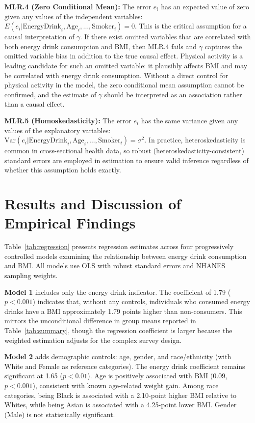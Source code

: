 \documentclass[12pt]{article}
\begin{document}
\textbf{MLR.4 (Zero Conditional Mean):} The error $e_i$ has an expected value of zero given any values of the independent variables: $E(e_i | \text{EnergyDrink}_i, \text{Age}_i, \ldots, \text{Smoker}_i) = 0$. This is the critical assumption for a causal interpretation of $\gamma$. If there exist omitted variables that are correlated with both energy drink consumption and BMI, then MLR.4 fails and $\gamma$ captures the omitted variable bias in addition to the true causal effect. Physical activity is a leading candidate for such an omitted variable: it plausibly affects BMI and may be correlated with energy drink consumption. Without a direct control for physical activity in the model, the zero conditional mean assumption cannot be confirmed, and the estimate of $\gamma$ should be interpreted as an association rather than a causal effect.

\textbf{MLR.5 (Homoskedasticity):} The error $e_i$ has the same variance given any values of the explanatory variables: $\text{Var}(e_i | \text{EnergyDrink}_i, \text{Age}_i, \ldots, \text{Smoker}_i) = \sigma^2$. In practice, heteroskedasticity is common in cross-sectional health data, so robust (heteroskedasticity-consistent) standard errors are employed in estimation to ensure valid inference regardless of whether this assumption holds exactly.

\section{Results and Discussion of Empirical Findings}



Table~\ref{tab:regression} presents regression estimates across four progressively controlled models examining the relationship between energy drink consumption and BMI. All models use OLS with robust standard errors and NHANES sampling weights.

\textbf{Model 1} includes only the energy drink indicator. The coefficient of 1.79 ($p < 0.001$) indicates that, without any controls, individuals who consumed energy drinks have a BMI approximately 1.79 points higher than non-consumers. This mirrors the unconditional difference in group means reported in Table~\ref{tab:summary}, though the regression coefficient is larger because the weighted estimation adjusts for the complex survey design.

\textbf{Model 2} adds demographic controls: age, gender, and race/ethnicity (with White and Female as reference categories). The energy drink coefficient remains significant at 1.65 ($p < 0.01$). Age is positively associated with BMI ($0.09$, $p < 0.001$), consistent with known age-related weight gain. Among race categories, being Black is associated with a 2.10-point higher BMI relative to Whites, while being Asian is associated with a 4.25-point lower BMI. Gender (Male) is not statistically significant.
\end{document}
